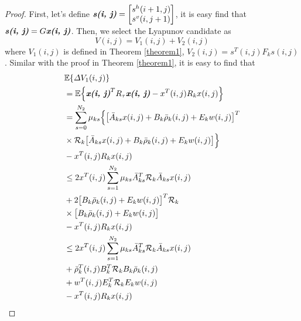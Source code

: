 \documentclass[conference]{IEEEtran}
\begin{document}
\begin{proof} 
	First, let's define $\emph{\textbf{s(i, j)}} = \begin{bmatrix}
	s^{h}(i+1,j)\\ s^{v}(i,j+1)
	\end{bmatrix}$,  it is easy find that $\emph{\textbf{s(i, j)}}=G\emph{\textbf{x(i, j)}}$.  Then, we select the Lyapunov candidate as
	\begin{equation}
		V(i,j)=V_{1}(i,j)+V_{2}(i,j)
	\end{equation}
	where $V_{1}(i,j)$ is defined in Theorem \ref{theorem1}, $V_{2}(i,j)=s^{T}(i,j)F_{k}s(i,j)$. Similar with the proof in Theorem \ref{theorem1}, it is easy to find that
	\begin{equation} \label{P2T1}
		\begin{split}
			&\mathbb{E}\{\varDelta V_{1}(i,j) \}\\
			&=\mathbb{E}\Big\{\emph{\textbf{x(i, j)}}^{T}R_{\tau}\emph{\textbf{x(i, j)}} - x^{T}(i,j)R_{k}x(i,j)\Big\}\\
			&=  \sum_{s=0}^{N_{2}}\mu_{ks}\Big\{\big[\bar{A}_{ks}x(i,j)+B_{k}\bar{\rho}_{k}(i,j)+E_{k}w(i,j)\big]^{T}\\
			&\times\mathcal{R}_{k} \big[ \bar{A}_{ks}x(i,j)+B_{k}\bar{\rho}_{k}(i,j)+E_{k}w(i,j)\big]\Big\}\\
			&-x^{T}(i,j)R_{k}x(i,j)\\
			&\leq 2x^{T}(i,j)\sum_{s=1}^{N_{2}}\mu_{ks}\bar{A}^{T}_{ks}\mathcal{R}_{k}\bar{A}_{ks}x(i,j) \\
			&+2\big[B_{k}\bar{\rho}_{k}(i,j)+E_{k}w(i,j)\big]^{T}\mathcal{R}_{k}\\
			&\times\big[B_{k}\bar{\rho}_{k}(i,j)+E_{k}w(i,j)\big]\\
			&-x^{T}(i,j)R_{k}x(i,j)\\
			&\leq 2x^{T}(i,j)\sum_{s=1}^{N_{2}}\mu_{ks}\bar{A}^{T}_{ks}\mathcal{R}_{k}\bar{A}_{ks}x(i,j) \\
			&+ \bar{\rho}^{T}_{k}(i,j)B^{T}_{k}\mathcal{R}_{k}B_{k}\bar{\rho}_{k}(i,j)\\
			&+w^{T}(i,j)E^{T}_{k}\mathcal{R}_{k}E_{k}w(i,j)\\
			&-x^{T}(i,j)R_{k}x(i,j)

\end{split}
\end{equation}
\end{proof}
\end{document}
